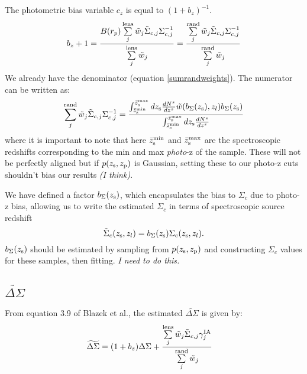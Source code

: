 \documentclass[onecolumn,amsmath,aps,fleqn, superscriptaddress]{revtex4}
\begin{document}
The photometric bias variable $c_z$ is equal to $(1+b_z)^{-1}$.
\begin{equation}
b_z+1 = \frac{B(r_p) \sum\limits^{\rm lens}_{j} \tilde{w}_j \tilde{\Sigma}_{c,j} \Sigma_{c,j}^{-1}}{\sum\limits^{\rm lens}_{j} \tilde{w}_j} = \frac{\sum\limits^{\rm rand}_{j} \tilde{w}_j \tilde{\Sigma}_{c,j} \Sigma_{c,j}^{-1}}{\sum\limits^{\rm rand}_{j} \tilde{w}_j}
\label{photozbias}
\end{equation}
We already have the denominator (equation \ref{sumrandweights}). The numerator can be written as:
\begin{equation}
\sum\limits^{\rm rand}_{j} \tilde{w}_j \tilde{\Sigma}_{c,j} \Sigma_{c,j}^{-1}  = \frac{\int_{\bar{z}_{\rm s}^{\rm min}}^{\bar{z}_{\rm s}^{\rm max}}dz_{\rm s} \frac{dN^s}{dz^s} \tilde{w}(b_{\Sigma}(z_{\rm s}), z_l) b_\Sigma(z_{\rm s})}{ \int_{\bar{z}_{\rm s}^{\rm min}}^{\bar{z}_{\rm s}^{\rm max}}dz_{\rm s} \frac{dN^s}{dz^s}}
\label{photoz}
\end{equation}
where it is important to note that here $\bar{z}_{\rm s}^{\rm min}$ and $\bar{z}_{\rm s}^{\rm max}$ are the spectroscopic redshifts corresponding to the min and max {\it photo}-z of the sample. These will not be perfectly aligned but if $p(z_{\rm s}, z_{\rm p})$ is Gaussian, setting these to our photo-z cuts shouldn't bias our results {\it (I think)}. 

We have defined a factor $b_{\Sigma}(z_{\rm s})$, which encapsulates the bias to $\Sigma_c$ due to photo-z bias, allowing us to write the estimated $\Sigma_c$ in terms of spectroscopic source redshift 
\begin{equation}
\tilde{\Sigma}_c(z_{\rm s}, z_l) = b_\Sigma(z_{\rm s}) \Sigma_c(z_{\rm s}, z_l).
\label{bsig}
\end{equation}
$b_\Sigma(z_{\rm s})$ should be estimated by sampling from $p(z_{\rm s}, z_{\rm p})$ and constructing $\Sigma_c$ values for these samples, then fitting. {\it I need to do this.}

\subsection{$\widetilde{\Delta \Sigma}$}
From equation 3.9 of Blazek et al., the estimated $\widetilde{\Delta \Sigma}$ is given by:
\begin{align}
\widetilde{\Delta \Sigma}&= (1+b_z) \Delta \Sigma + \frac{\sum\limits_{j}^{\rm lens} \tilde{w}_j \tilde{\Sigma}_{c,j} \gamma^{\rm IA}_j }{\sum\limits_{j}^{\rm rand} \tilde{w}_j} 
\label{deltasigma}
\end{align}
\end{document}
